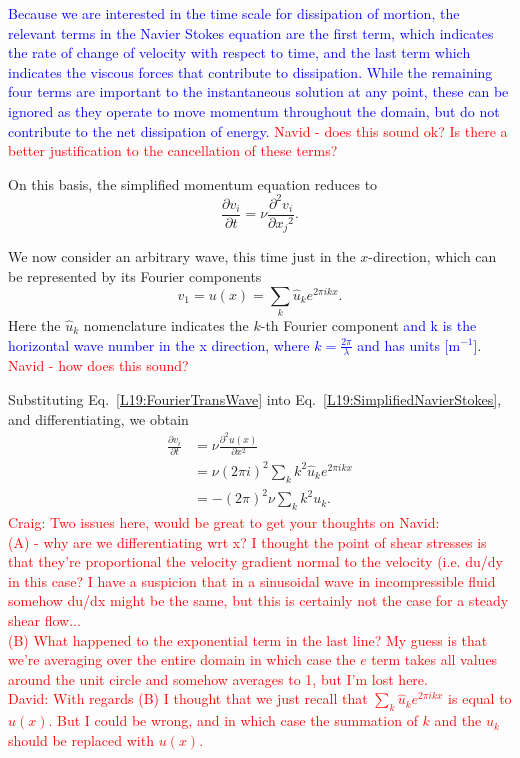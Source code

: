 \textcolor{blue}{Because we are interested in the time scale for dissipation of mortion, the relevant terms in the Navier Stokes equation are the first term, which indicates the rate of change of velocity with respect to time, and the last term which indicates the viscous forces that contribute to dissipation. While the remaining four terms are important to the instantaneous solution at any point, these can be ignored as they operate to move momentum throughout the domain, but do not contribute to the net dissipation of energy.} \textcolor{red}{Navid - does this sound ok? Is there a better justification to the cancellation of these terms?}

On this basis, the simplified momentum equation reduces to 
\begin{equation}
    \frac{\partial v_i}{\partial t} = \nu \frac{\partial^2 v_i}{\partial {x_j}^2}.\label{L19:SimplifiedNavierStokes}
\end{equation}

We now consider an arbitrary wave, this time just in the $x$-direction, which can be represented by its Fourier components
\begin{equation}
    v_1 = u(x) = \sum_{k} \hat{u}_k e^{2 \pi ikx}.\label{L19:FourierTransWave}
\end{equation}
Here the ${\hat{u}}_k$ nomenclature indicates the $k$-th Fourier component \textcolor{blue}{and k is the horizontal wave number in the x direction, where $k=\frac{2\pi}{\lambda}$ and has units [m$^{-1}$]}. \textcolor{red}{Navid - how does this sound?}

Substituting Eq.~\eqref{L19:FourierTransWave} into Eq.~\eqref{L19:SimplifiedNavierStokes}, and differentiating, we obtain
\begin{align}
    \frac{\partial v_i}{\partial t} &= \nu \frac{\partial^2 u(x)}{\partial x^2}\\
    &=\nu(2\pi i)^2\sum_k k^2 \hat{u}_k e^{2\pi ikx}\\
    &=-(2\pi)^2\nu\sum_kk^2 u_k. \label{L19:FrictionalDiss}
\end{align}
\textcolor{red}{Craig: Two issues here, would be great to get your thoughts on Navid:\\ 
(A) - why are we differentiating wrt x? I thought the point of shear stresses is that they're proportional the velocity gradient normal to the velocity (i.e. du/dy in this case? I have a suspicion that in a sinusoidal wave in incompressible fluid somehow du/dx might be the same, but this is certainly not the case for a steady shear flow...\\ 
(B) What happened to the exponential term in the last line? My guess is that we're averaging over the entire domain in which case the $e$ term takes all values around the unit circle and somehow averages to 1, but I'm lost here. \\David: With regards (B) I thought that we just recall that $\sum_{k} \hat{u}_k e^{2 \pi ikx}$ is equal to $u(x)$. But I could be wrong, and in which case the summation of $k$ and the $u_k$ should be replaced with $u(x)$. } 


